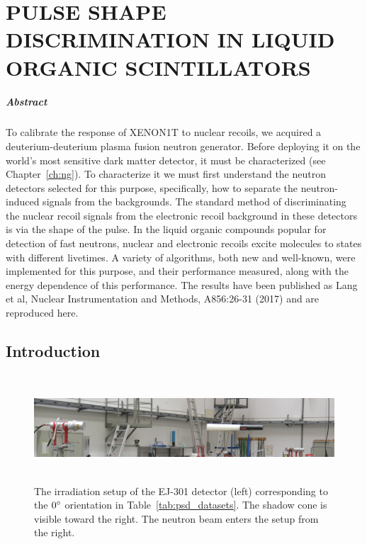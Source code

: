
\chapter{PULSE SHAPE DISCRIMINATION IN LIQUID ORGANIC SCINTILLATORS}\label{ch:psd}

\paragraph{Abstract} To calibrate the response of XENON1T to nuclear recoils, we acquired a deuterium-deuterium plasma fusion neutron generator. Before deploying it on the world's most sensitive dark matter detector, it must be characterized (see Chapter~\ref{ch:ng}). To characterize it we must first understand the neutron detectors selected for this purpose, specifically, how to separate the neutron-induced signals from the backgrounds. The standard method of discriminating the nuclear recoil signals from the electronic recoil background in these detectors is via the shape of the pulse. In the liquid organic compounds popular for detection of fast neutrons, nuclear and electronic recoils excite molecules to states with different livetimes. A variety of algorithms, both new and well-known, were implemented for this purpose, and their performance measured, along with the energy dependence of this performance. The results have been published as Lang et al, Nuclear Instrumentation and Methods, A856:26-31 (2017) and are reproduced here.

\section{Introduction}

\begin{figure}[htbp]
\centering
    \includegraphics[width=\textwidth,height=4cm]{figures/psd/fig_ptb_setup}
    \caption{The irradiation setup of the EJ-301 detector (left) corresponding to the $0{}^{\circ}$ orientation in Table~\ref{tab:psd_datasets}. The shadow cone is visible toward the right. The neutron beam enters the setup from the right.}\label{fig:psd_detector_setup}
\end{figure}

